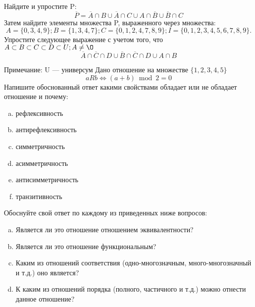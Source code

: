\documentclass[10pt]{exam}
\begin{document}
\begin{questions}
\question
Найдите и упростите P:
\begin{equation*}
\overline{P} = \overline{A} \cap B \cup \overline{A} \cap C \cup A \cap \overline{B} \cup \overline{B} \cap C
\end{equation*}
Затем найдите элементы множества P, выраженного через множества:
\begin{equation*}
A = \{0, 3, 4, 9\}; 
B = \{1, 3, 4, 7\};
C = \{0, 1, 2, 4, 7, 8, 9\};
I = \{0, 1, 2, 3, 4, 5, 6, 7, 8, 9\}.
\end{equation*}\question
Упростите следующее выражение с учетом того, что $A\subset B \subset C \subset D \subset U; A \neq \O$
\begin{equation*}
\overline{A} \cap \overline{C} \cap D \cup \overline{B} \cap \overline{C} \cap D \cup A \cap B
\end{equation*}

Примечание: U — универсум\question
Дано отношение на множестве $\{1, 2, 3, 4, 5\}$ 
\begin{equation*}
aRb \iff (a+b) \bmod 2 =0
\end{equation*}
Напишите обоснованный ответ какими свойствами обладает или не обладает отношение и почему:   
\begin{enumerate} [a)]\setcounter{enumi}{0}
\item рефлексивность
\item антирефлексивность
\item симметричность
\item асимметричность
\item антисимметричность
\item транзитивность
\end{enumerate}

Обоснуйте свой ответ по каждому из приведенных ниже вопросов:
\begin{enumerate} [a)]\setcounter{enumi}{0}
    \item Является ли это отношение отношением эквивалентности?
    \item Является ли это отношение функциональным?
    \item Каким из отношений соответствия (одно-многозначным, много-многозначный и т.д.) оно является?
    \item К каким из отношений порядка (полного, частичного и т.д.) можно отнести данное отношение?
\end{enumerate}




\end{questions}
\end{document}
